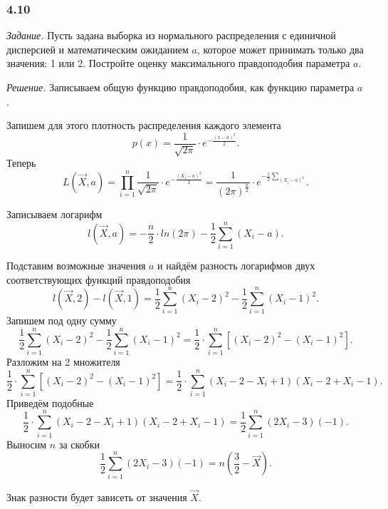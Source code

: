 \subsubsection*{4.10}

\textit{Задание.}
Пусть задана выборка из нормального распределения с единичной
дисперсией и математическим ожиданием $a$, которое может принимать только два значения: 1 или 2.
Постройте оценку максимального правдоподобия параметра $a$.

\textit{Решение.} Записываем общую функцию правдоподобия, как функцию параметра $a$.

Запишем для этого плотность распределения каждого элемента
$$p \left( x \right) =
  \frac{1}{ \sqrt{2 \pi }} \cdot e^{- \frac{ \left( x - a \right)^2}{2}}.$$
Теперь
$$L \left( \vec{X}, a \right) =
  \prod \limits_{i = 1}^n \frac{1}{ \sqrt{2 \pi }} \cdot e^{- \frac{ \left( X_i - a \right)^2}{2}} =
  \frac{1}{ \left( 2 \pi \right)^{ \frac{n}{2}}} \cdot
  e^{- \frac{1}{2} \sum \limits_{ \left( X_i - a \right)^2}}.$$

Записываем логарифм
$$l \left( \vec{X}, a \right) =
  - \frac{n}{2} \cdot ln \left( 2 \pi \right) -
  \frac{1}{2} \sum \limits_{i = 1}^n \left( X_i - a \right).$$

Подставим возможные значения $a$ и найдём разность логарифмов двух
соответствующих функций правдоподобия
$$l \left( \vec{X}, 2 \right) - l \left( \vec{X}, 1 \right) =
  \frac{1}{2} \sum \limits_{i = 1}^n \left( X_i - 2 \right)^2 -
  \frac{1}{2} \sum \limits_{i = 1}^n \left( X_i - 1 \right)^2.$$
Запишем под одну сумму
$$ \frac{1}{2} \sum \limits_{i = 1}^n \left( X_i - 2 \right)^2 -
  \frac{1}{2} \sum \limits_{i = 1}^n \left( X_i - 1 \right)^2 =
  \frac{1}{2} \cdot
  \sum \limits_{i = 1}^n \left[ \left( X_i - 2 \right)^2 - \left( X_i - 1 \right)^2 \right].$$
Разложим на 2 множителя
$$ \frac{1}{2} \cdot
  \sum \limits_{i = 1}^n \left[ \left( X_i - 2 \right)^2 - \left( X_i - 1 \right)^2 \right] =
  \frac{1}{2} \cdot
  \sum \limits_{i = 1}^n \left( X_i - 2 - X_i + 1 \right) \left( X_i - 2 + X_i - 1 \right).$$
Приведём подобные
$$ \frac{1}{2} \cdot
  \sum \limits_{i = 1}^n \left( X_i - 2 - X_i + 1 \right) \left( X_i - 2 + X_i - 1 \right) =
  \frac{1}{2} \sum \limits_{i = 1}^n \left( 2X_i - 3 \right) \left( -1 \right).$$
Выносим $n$ за скобки
$$ \frac{1}{2} \sum \limits_{i = 1}^n \left( 2X_i - 3 \right) \left( -1 \right) =
  n \left( \frac{3}{2} - \vec{X} \right).$$

Знак разности будет зависеть от значения $ \vec{X}$.

